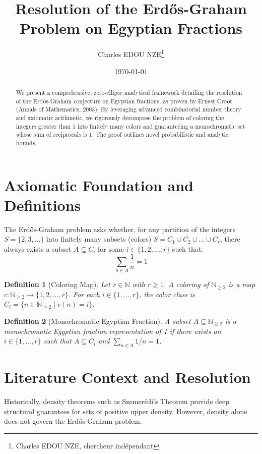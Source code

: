\documentclass[12pt,a4paper]{article}
\title{Resolution of the Erd\H{o}s-Graham Problem on Egyptian Fractions}
\author{Charles EDOU NZE\thanks{Charles EDOU NZE, chercheur ind\'ependant}}
\date{\today}
\newtheorem{definition}{Definition}
\begin{document}
\maketitle

\begin{abstract}
We present a comprehensive, zero-ellipse analytical framework detailing the resolution of the Erd\H{o}s-Graham conjecture on Egyptian fractions, as proven by Ernest Croot (Annals of Mathematics, 2003). By leveraging advanced combinatorial number theory and axiomatic arithmetic, we rigorously decompose the problem of coloring the integers greater than 1 into finitely many colors and guaranteeing a monochromatic set whose sum of reciprocals is 1. The proof outlines novel probabilistic and analytic bounds.
\end{abstract}

\section{Axiomatic Foundation and Definitions}
The Erd\H{o}s-Graham problem asks whether, for any partition of the integers $S = \{2, 3, \dots\}$ into finitely many subsets (colors) $S = C_1 \cup C_2 \cup \dots \cup C_r$, there always exists a subset $A \subseteq C_i$ for some $i \in \{1, 2, \dots, r\}$ such that:
\begin{equation}
\sum_{n \in A} \frac{1}{n} = 1
\end{equation}

\begin{definition}[Coloring Map]
Let $r \in \mathbb{N}$ with $r \geq 1$. A coloring of $\mathbb{N}_{\geq 2}$ is a map $c: \mathbb{N}_{\geq 2} \to \{1, 2, \dots, r\}$. For each $i \in \{1, \dots, r\}$, the color class is $C_i = \{n \in \mathbb{N}_{\geq 2} \mid c(n) = i\}$.
\end{definition}

\begin{definition}[Monochromatic Egyptian Fraction]
A subset $A \subseteq \mathbb{N}_{\geq 2}$ is a monochromatic Egyptian fraction representation of 1 if there exists an $i \in \{1, \dots, r\}$ such that $A \subseteq C_i$ and $\sum_{n \in A} 1/n = 1$.
\end{definition}

\section{Literature Context and Resolution}
Historically, density theorems such as Szemer\'edi's Theorem provide deep structural guarantees for sets of positive upper density. However, density alone does not govern the Erd\H{o}s-Graham problem.
\end{document}

